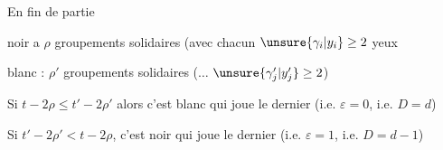 En fin de partie

noir a $\rho$ groupements solidaires  (avec chacun
$\unsure{\gamma_i|y_i}\geq2$ yeux

blanc : $\rho'$ groupements solidaires  ($\ldots$ $\unsure{\gamma'_j|y'_j}\geq2$)


Si $t-2\rho\leq t'-2\rho'$
alors c'est blanc qui joue le dernier
(i.e. $\varepsilon=0$, i.e. $D=d$)

Si $t'-2\rho'<t-2\rho$,
c'est noir qui joue le dernier
(i.e. $\varepsilon=1$, i.e. $D=d-1$)
